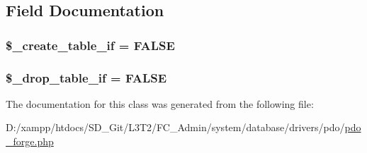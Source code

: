 \subsection{Field Documentation}
\hypertarget{class_c_i___d_b__pdo__forge_a2f6484fcb8d1dc3eef67a637227cd583}{}
\subsubsection[{\$\+\_\+create\+\_\+table\+\_\+if}]{\setlength{\rightskip}{0pt plus 5cm}\$\+\_\+create\+\_\+table\+\_\+if = F\+A\+L\+S\+E\hspace{0.3cm}{\ttfamily [protected]}}\label{class_c_i___d_b__pdo__forge_a2f6484fcb8d1dc3eef67a637227cd583}
\hypertarget{class_c_i___d_b__pdo__forge_a92a8a9145a7fc91e252e58d019373581}{}
\subsubsection[{\$\+\_\+drop\+\_\+table\+\_\+if}]{\setlength{\rightskip}{0pt plus 5cm}\$\+\_\+drop\+\_\+table\+\_\+if = F\+A\+L\+S\+E\hspace{0.3cm}{\ttfamily [protected]}}\label{class_c_i___d_b__pdo__forge_a92a8a9145a7fc91e252e58d019373581}


The documentation for this class was generated from the following file\+:\begin{DoxyCompactItemize}
\item 
D\+:/xampp/htdocs/\+S\+D\+\_\+\+Git/\+L3\+T2/\+F\+C\+\_\+\+Admin/system/database/drivers/pdo/\hyperlink{pdo__forge_8php}{pdo\+\_\+forge.\+php}\end{DoxyCompactItemize}
